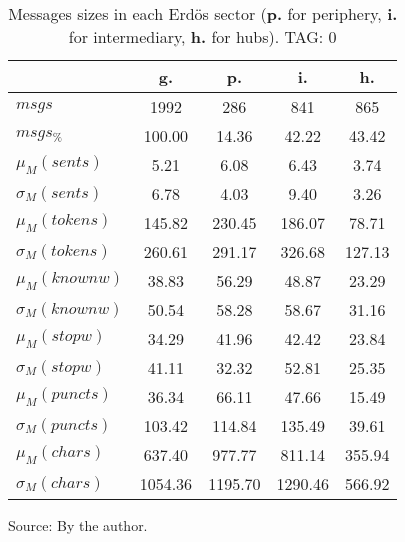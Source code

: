 \begin{table}[h!]
\begin{center}
	\caption{Messages sizes in each Erd\"os sector ({{\bf p.}} for periphery, {{\bf i.}} for intermediary, {{\bf h.}} for hubs). TAG: 0}\label{tab:sizesMsgs}
\begin{tabular}{| l || c | c | c | c |}\hline
 & {\bf g.} & {\bf p.} & {\bf i.} & {\bf h.} \\\hline\hline
$msgs$ & 1992  & 286  & 841  & 865 \\
$msgs_{\%}$ & 100.00  & 14.36  & 42.22  & 43.42 \\\hline
$\mu_M(sents)$ & 5.21  & 6.08  & 6.43  & 3.74 \\
$\sigma_M(sents)$ & 6.78  & 4.03  & 9.40  & 3.26 \\\hline
$\mu_M(tokens)$ & 145.82  & 230.45  & 186.07  & 78.71 \\
$\sigma_M(tokens)$ & 260.61  & 291.17  & 326.68  & 127.13 \\\hline
$\mu_M(knownw)$ & 38.83  & 56.29  & 48.87  & 23.29 \\
$\sigma_M(knownw)$ & 50.54  & 58.28  & 58.67  & 31.16 \\\hline
$\mu_M(stopw)$ & 34.29  & 41.96  & 42.42  & 23.84 \\
$\sigma_M(stopw)$ & 41.11  & 32.32  & 52.81  & 25.35 \\\hline
$\mu_M(puncts)$ & 36.34  & 66.11  & 47.66  & 15.49 \\
$\sigma_M(puncts)$ & 103.42  & 114.84  & 135.49  & 39.61 \\\hline
$\mu_M(chars)$ & 637.40  & 977.77  & 811.14  & 355.94 \\
$\sigma_M(chars)$ & 1054.36  & 1195.70  & 1290.46  & 566.92 \\\hline
\end{tabular}
\begin{flushleft}\footnotesize
		Source: By the author.\
\end{flushleft}
\end{center}
\end{table}

